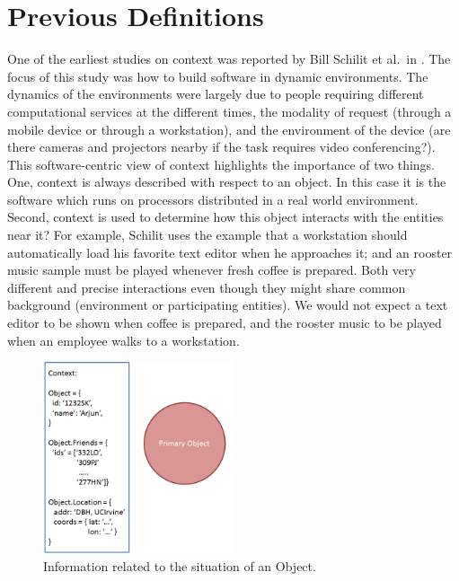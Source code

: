 \section{Previous Definitions}

One of the earliest studies on context was reported by Bill Schilit et al.\ in \cite{schilit1994context}. The focus of this study was how to build software in dynamic environments. The dynamics of the environments were largely due to people requiring different computational services at the different times, the modality of request (through a mobile device or through a workstation), and the environment of the device (are there cameras and projectors nearby if the task requires video conferencing?). This software-centric view of context highlights the importance of two things. One, context is always described with respect to an object. In this case it is the software which runs on processors distributed in a real world environment. Second, context is used to determine how this object interacts with the entities near it? For example, Schilit uses the example that a workstation should automatically load his favorite text editor when he approaches it; and an rooster music sample must be played whenever fresh coffee is prepared. Both very different and precise interactions even though they might share common background (environment or participating entities). We would not expect a text editor to be shown when coffee is prepared, and the rooster music to be played when an employee walks to a workstation.

\begin{figure}[t]
\centering
\includegraphics[width=0.5\textwidth]{media/chapter2/dey-def.png}
\caption{Information related to the situation of an Object.}
\label{fig:anind-def}
\end{figure}

